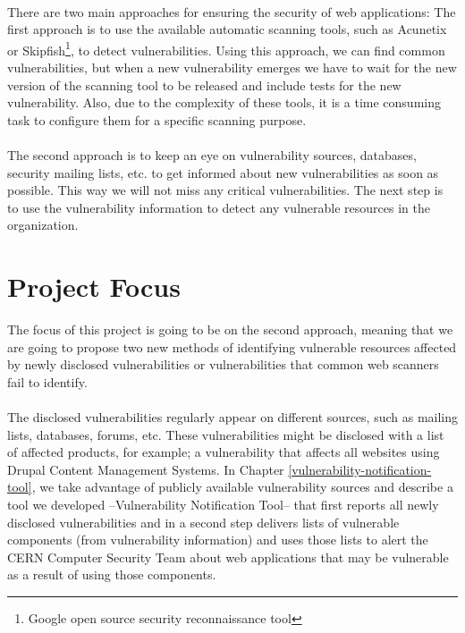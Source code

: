 \paragraph{}
There are two main approaches for ensuring the security of web applications: The first approach is to use the available automatic scanning tools, such as Acunetix or Skipfish\footnote{Google open source security reconnaissance tool}, to detect vulnerabilities. Using this approach, we can find common vulnerabilities, but when a new vulnerability emerges we have to wait for the new version of the scanning tool to be released and include tests for the new vulnerability. Also, due to the complexity of these tools, it is a time consuming task to configure them for a specific scanning purpose. 
\paragraph{}
The second approach is to keep an eye on vulnerability sources, databases, security mailing lists, etc. to get informed about new vulnerabilities as soon as possible. This way we will not miss any critical vulnerabilities. The next step is to use the vulnerability information to detect any vulnerable resources in the organization. 
\section{Project Focus}
The focus of this project is going to be on the second approach, meaning that we are going to propose two new methods of identifying vulnerable resources affected by newly disclosed vulnerabilities or vulnerabilities that common web scanners fail to identify. 
\paragraph{}
The disclosed vulnerabilities regularly appear on different sources, such as mailing lists, databases, forums, etc. These vulnerabilities might be disclosed with a list of affected products, for example; a vulnerability that affects all websites using Drupal Content Management Systems. In Chapter \ref{vulnerability-notification-tool}, we take advantage of publicly available vulnerability sources and describe a tool we developed --Vulnerability Notification Tool-- that first reports all newly disclosed vulnerabilities and in a second step delivers lists of vulnerable components (from vulnerability information) and uses those lists to alert the CERN Computer Security Team about web applications that may be vulnerable as a result of using those components.
